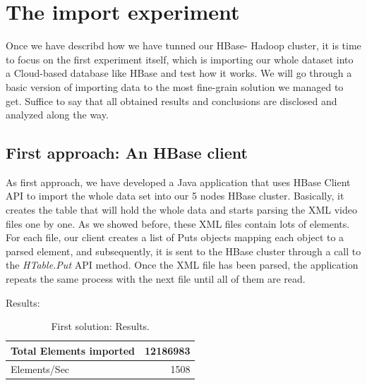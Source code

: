 \section{The import experiment}

Once we have describd how we have tunned our HBase- Hadoop cluster, it is time to focus on the first experiment itself, which is importing our whole dataset into a Cloud-based database like HBase and test how it works. We will go through a basic version of importing data to the most fine-grain solution we managed to get. Suffice to say that all obtained results and conclusions are disclosed and analyzed along the way.

\subsection{First approach: An HBase client}

As first approach, we have developed a Java application that uses HBase Client API to import the whole data set into our 5 nodes HBase cluster. Basically, it creates the table that will hold the whole data and starts parsing the XML video files one by one. As we showed before, these XML files contain lots of elements. For each file, our client creates a list of Puts objects mapping each object to a parsed element, and subsequently, it is sent to the HBase cluster through a call to the \textit{HTable.Put} API method. Once the XML file has been parsed, the application repeats the same process with the next file until all of them are read.

\bigskip

Results:

\bigskip



\begin{table}[htbp]
\begin{center}
\begin{tabular}{|l|r|}
\hline
Total Elements imported & 12186983 \\ \hline
Elements/Sec & 1508 \\ \hline
\end{tabular}
\caption{First solution: Results.}
\label{First solution: Results}
\end{center}
\end{table}




